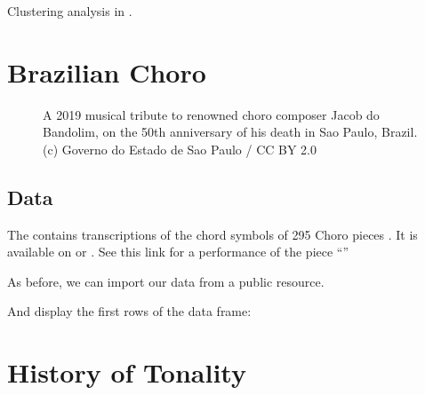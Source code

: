 \documentclass[letterpaper,10pt,english]{sphinxmanual}
\begin{document}
Clustering analysis in .


\chapter{Brazilian Choro}
\label{\detokenize{choro:brazilian-choro}}\label{\detokenize{choro::doc}}
\begin{figure}[htbp]
\centering
\capstart

\noindent{}
\caption{A 2019 musical tribute to renowned choro composer Jacob do Bandolim,
on the 50th anniversary of his death in Sao Paulo, Brazil. (c) Governo do Estado de Sao Paulo / CC BY 2.0}\label{\detokenize{choro:id2}}\end{figure}


\section{Data}
\label{\detokenize{choro:data}}
The  contains transcriptions of the chord symbols
of 295 Choro pieces . It is available on  or .
See this link for a performance of the piece “”

As before, we can import our data from a public resource.

\begin{sphinxVerbatim}[commandchars=\\\{\}]
   \PYGZbs{}
\end{sphinxVerbatim}

And display the first rows of the data frame:

\begin{sphinxVerbatim}[commandchars=\\\{\}]
\end{sphinxVerbatim}


\chapter{History of Tonality}
\label{\detokenize{tonality:history-of-tonality}}\label{\detokenize{tonality::doc}}
\end{document}
